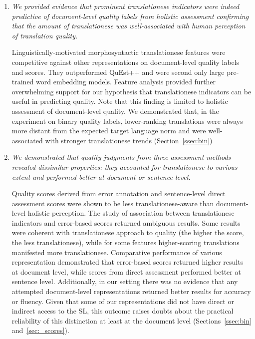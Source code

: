 \begin{enumerate}
	\item \textit{We provided evidence that prominent translationese indicators were indeed predictive of document-level quality labels from holistic assessment confirming that the amount of translationese was well-associated with human perception of translation quality.}   
	
	Linguistically-motivated morphosyntactic translationese features were competitive against other representations on document-level quality labels and scores. They outperformed QuEst++ and were second only large pre-trained word embedding models. Feature analysis provided further overwhelming support for our hypothesis that translationese indicators can be useful in predicting quality. Note that this finding is limited to holistic assessment of document-level quality. We demonstrated that, in the experiment on binary quality labels, lower-ranking translations were always more distant from the expected target language norm and were well-associated with stronger translationese trends (Section~\ref{ssec:bin})
	
	\item \textit{We demonstrated that quality judgments from three assessment methods revealed dissimilar properties: they accounted for translationese to various extent and performed better at document or sentence level.} 
	
	Quality scores derived from error annotation and sentence-level direct assessment scores were shown to be less translationese-aware than document-level holistic perception. The study of association between translationese indicators and error-based scores returned ambiguous results. Some results were coherent with translationese approach to quality (the higher the score, the less translationese), while for some features higher-scoring translations manifested more translationese.
	Comparative performance of various representation demonstrated that error-based scores returned higher results at document level, while scores from direct assessment performed better at sentence level. %
	Additionally, in our setting there was no evidence that any attempted document-level representations returned better results for accuracy or fluency. Given that some of our representations did not have direct or indirect access to the SL, this outcome raises doubts about the practical reliability of this distinction at least at the document level (Sections~\ref{ssec:bin} and~\ref{sec:_scores}). 
	

\end{enumerate}
